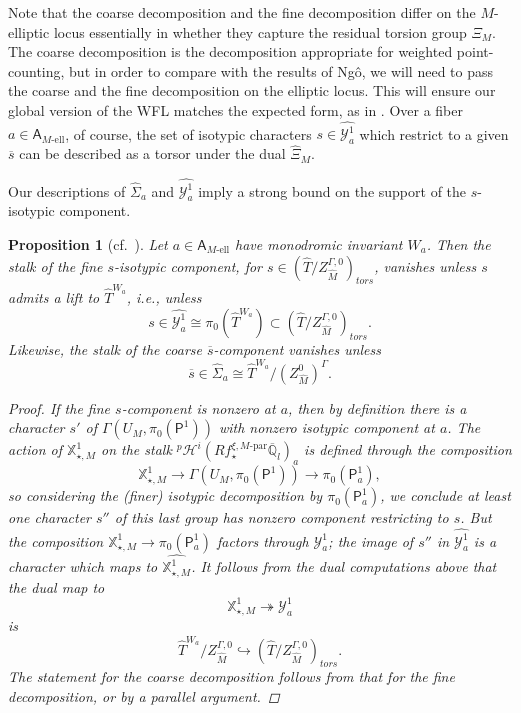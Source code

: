 \documentclass[openany]{amsbook}
\newtheorem{proposition}[theorem]{Proposition}
\theoremstyle{definition}
\theoremstyle{remark}
\numberwithin{equation}{section}
\newcommand{\Q}{\mathbb{Q}}
\newcommand{\cY}{\mathcal{Y}}
\newcommand{\ol}[1]{\overline{#1}}
\renewcommand{\-}{\operatorname{-}}
\newcommand{\pHi}{{}^p \mathcal{H}^i}
\newcommand{\el}{\text{-ell}}
\newcommand{\bA}{\mathsf{A}}
\newcommand{\bX}{\mathbb{X}}
\newcommand{\bAe}[1]{\bA_{#1\el}}
\newcommand{\bP}{\mathsf{P}}
\newcommand{\Mpar}{M\text{-par}}
\newcommand{\tors}{\mathit{tors}}
\begin{document}
Note that the coarse decomposition and the fine decomposition differ on the $M$-elliptic locus essentially in whether they capture the residual torsion group $\Xi_M$. The coarse decomposition is the decomposition appropriate for weighted point-counting, but in order to compare with the results of Ng\^{o}, we will need to pass the coarse and the fine decomposition on the elliptic locus. This will ensure our global version of the WFL matches the expected form, as in \cite[\S VII.2.2]{MWStabII}. Over a fiber $a \in \bAe{M}$, of course, the set of isotypic characters $s \in \widehat{\cY^1_a}$ which restrict to a given $\ol{s}$ can be described as a torsor under the dual $\widehat{\Xi}_M$. 






Our descriptions of $\widehat{\Sigma}_a$ and $\widehat{\cY^1_a}$ imply a strong bound on the support of the $s$-isotypic component.

\begin{proposition}[{cf.\ \cite[Th\'eor\`eme 8.5.1(1)]{CLII}}]\label{prop.s.isotypic.cpt.support}
    Let $a \in \bAe{M}$ have monodromic invariant $W_a$. Then the stalk of the fine $s$-isotypic component, for $s \in (\widehat{T}/Z_{\widehat{M}}^{\Gamma, 0})_{\tors}$, vanishes unless $s$ admits a lift to $\widehat{T}^{W_a}$, i.e., unless
    $$
        s \in \widehat{\cY_a^1} \cong \pi_0(\widehat{T}^{W_a}) \subset (\widehat{T}/Z_{\widehat{M}}^{\Gamma, 0})_{\tors}.
    $$
    Likewise, the stalk of the coarse $\ol{s}$-component vanishes unless 
    $$
        \ol{s} \in \widehat{\Sigma}_a \cong \widehat{T}^{W_a}/(Z_{\widehat{M}}^0)^{\Gamma}.
    $$
    \begin{proof}
        If the fine $s$-component is nonzero at $a$, then by definition there is a character $s'$ of $\Gamma(U_M, \pi_0(\bP^{1}))$ with nonzero isotypic component at $a$. The action of $\bX_{\star, M}^1$ on the stalk $\pHi(R f_\star^{\xi, \Mpar} \ol{\Q}_l)_{a}$ is defined through the composition
        $$
            \bX_{\star, M}^1 \to \Gamma(U_M, \pi_0(\bP^{1})) \to \pi_0(\bP^{1}_a),
        $$
        so considering the (finer) isotypic decomposition by $\pi_0(\bP^{1}_a)$, we conclude at least one character $s''$ of this last group has nonzero component restricting to $s$. But the composition $\bX_{\star, M}^1 \to \pi_0(\bP^{1}_a)$ factors through $\cY^1_a$; the image of $s''$ in $\widehat{\cY^1_a}$ is a character which maps to $\widehat{\bX_{\star, M}^1}$. It follows from the dual computations above that the dual map to 
        $$\bX_{\star, M}^1 \twoheadrightarrow \cY^1_a$$ is
        $$ \widehat{T}^{W_a}/Z^{\Gamma,0}_{\widehat{M}} \hookrightarrow (\widehat{T}/Z^{\Gamma,0}_{\widehat{M}})_{\tors}.
        $$
        The statement for the coarse decomposition follows from that for the fine decomposition, or by a parallel argument. 
    \end{proof}
\end{proposition}
\end{document}
